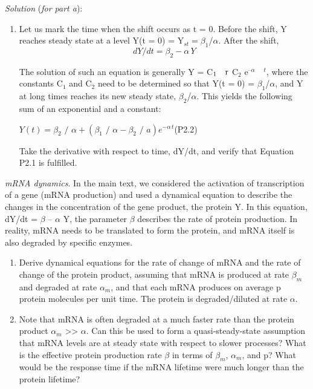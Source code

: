 \begin{exerciselist}
\textit{Solution} (\textit{for part a})$:$

\begin{enumerate}
\item
 Let us mark the time when the shift occurs as t = 0. Before the shift, Y 
reaches steady state at a level Y(t = 0) = Y$_{st}=\beta _{1}$/$\alpha 
$. After the shift,
\begin{equation}
dY/dt = \beta _2 - \alpha \,Y
\end{equation}

The solution of such an equation is generally Y = C$_{1} \quad {\rm r}$ C$_{2}$ 
e$^{\mbox{--}\alpha } \quad ^{t}$, where the constants C$_{1}$ and C$_{2}$ need 
to be determined so that Y(t = 0) = $\beta _{1}$/$\alpha $, and Y at long 
times reaches its new steady state, $\beta _{2}$/$\alpha $. This yields 
the following sum of an exponential and a constant:

$Y(t) = \beta _2 \mbox{ / }\alpha + (\beta _1 \mbox{ / }\alpha - \beta _2 
\mbox{ / }a)e^{ - \alpha \,t}$(P2.2)

Take the derivative with respect to time, dY/dt, and verify that Equation 
P2.1 is fulfilled.
\end{enumerate}

\item \textit{mRNA dynamics}. In the main text, we considered the activation of transcription of a 
gene (mRNA production) and used a dynamical equation to describe the changes 
in the concentration of the gene product, the protein Y. In this equation, 
dY/dt = $\beta $ -- $\alpha $ Y, the parameter $\beta $ describes the rate 
of protein production. In reality, mRNA needs to be translated to form the 
protein, and mRNA itself is also degraded by specific enzymes.

\begin{enumerate}
\item Derive dynamical equations for the rate of change of mRNA and the rate of 
change of the protein product, assuming that mRNA is produced at rate $\beta 
_{m}$ and degraded at rate $\alpha _{m}$, and that each mRNA produces on 
average p protein molecules per unit time. The protein is degraded/diluted 
at rate $\alpha $.

\item Note that mRNA is often degraded at a much faster rate than the protein 
product $\alpha _{m}$ >> $\alpha $. Can this be used to form a 
quasi-steady-state assumption that mRNA levels are at steady state with 
respect to slower processes? What is the effective protein production rate 
$\beta $ in terms of $\beta _{m}$, $\alpha _{m}$, and p? What would be 
the response time if the mRNA lifetime were much longer than the protein 
lifetime?
\end{enumerate}


\end{exerciselist}
